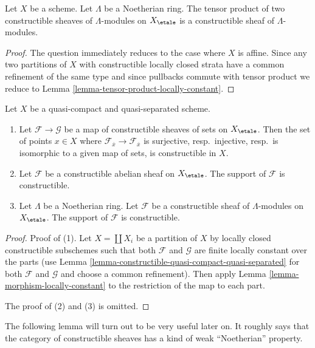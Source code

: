\begin{lemma}
\label{lemma-tensor-product-constructible}
Let $X$ be a scheme. Let $\Lambda$ be a Noetherian ring.
The tensor product of two constructible sheaves of $\Lambda$-modules
on $X_\etale$ is a constructible sheaf of $\Lambda$-modules.
\end{lemma}

\begin{proof}
The question immediately reduces to the case where $X$ is affine.
Since any two partitions of $X$ with constructible locally
closed strata have a common refinement of the same type and
since pullbacks commute with tensor product we reduce to
Lemma \ref{lemma-tensor-product-locally-constant}.
\end{proof}

\begin{lemma}
\label{lemma-support-constructible}
Let $X$ be a quasi-compact and quasi-separated scheme.
\begin{enumerate}
\item Let $\mathcal{F} \to \mathcal{G}$ be a map of constructible
sheaves of sets on $X_\etale$. Then the set of points $x \in X$
where $\mathcal{F}_{\overline{x}} \to \mathcal{F}_{\overline{x}}$
is surjective, resp.\ injective, resp.\ is isomorphic to a given map
of sets, is constructible in $X$.
\item Let $\mathcal{F}$ be a constructible abelian sheaf on $X_\etale$.
The support of $\mathcal{F}$ is constructible.
\item Let $\Lambda$ be a Noetherian ring.
Let $\mathcal{F}$ be a constructible sheaf of $\Lambda$-modules on $X_\etale$.
The support of $\mathcal{F}$ is constructible.
\end{enumerate}
\end{lemma}

\begin{proof}
Proof of (1).
Let $X = \coprod X_i$ be a partition of $X$ by locally closed constructible
subschemes such that both $\mathcal{F}$ and $\mathcal{G}$ are
finite locally constant over the parts (use
Lemma \ref{lemma-constructible-quasi-compact-quasi-separated}
for both $\mathcal{F}$ and $\mathcal{G}$ and choose a common
refinement). Then apply Lemma \ref{lemma-morphism-locally-constant}
to the restriction of the map to each part.

\medskip\noindent
The proof of (2) and (3) is omitted.
\end{proof}

\noindent
The following lemma will turn out to be very useful later on.
It roughly says that the category of constructible sheaves
has a kind of weak ``Noetherian'' property.

